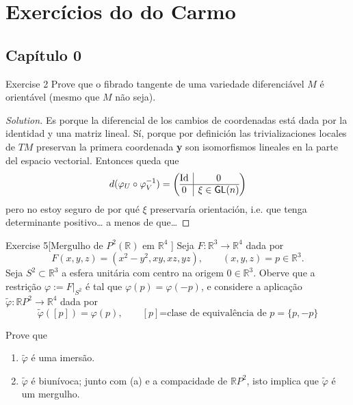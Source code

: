 \section{Exercícios do do Carmo}

\subsection{Capítulo 0}
\begin{thing4}{Exercise 2}\label{exer:2}\leavevmode
Prove que o fibrado tangente de uma variedade diferenciável \(M\) é orientável (mesmo que \(M\) não seja).
\end{thing4}

\begin{proof}[Solution]\leavevmode
Es porque la diferencial de los cambios de coordenadas está dada por la identidad y una matriz lineal. Sí, porque por definición las trivializaciones locales de \(TM\) preservan la primera coordenada \textbf{y} son isomorfismos lineales en la parte del espacio vectorial. Entonces queda que 
\[d(\varphi_U \circ \varphi_V^{-1})=\left(\begin{array}{@{}c|c@{}}
\operatorname{Id}&0\\
\hline
0&\xi \in \mathsf{GL}(n)\end{array}\right)\]
pero no estoy seguro de por qué \(\xi\) preservaría orientación, i.e. que tenga determinante positivo… a menos de que… 
\end{proof}

\begin{thing4}{Exercise 5}[Mergulho de \(P^2(\mathbb{R})\) em \(\mathbb{R}^4\) ]\label{exer:5}\leavevmode
Seja \(F:\mathbb{R}^3 \to \mathbb{R}^4\) dada por
\[F(x,y,z)=(x^2-y^2,xy,xz,yz),\qquad (x,y,z) = p \in \mathbb{R}^3.\]
Seja \(S^2 \subset \mathbb{R}^3\) a esfera unitária com centro na origem \(0 \in \mathbb{R}^3\). Oberve que a restrição \( \varphi:= F|_{S^2}\) é tal que \(\varphi(p)=\varphi(-p)\), e considere a aplicação \(\tilde{\varphi}:\mathbb{R}P^2 \to \mathbb{R}^4\) dada por
\[\tilde{ \varphi}([p])=\varphi(p),\qquad [p]\text{=clase de equivalência de \(p=\{p,-p\}\)} \]

Prove que
\begin{enumerate}[label=(\alph*)]
\item \(\tilde{\varphi}\) é uma imersão.
\item \(\tilde{\varphi}\) é biunívoca; junto com (a) e a compacidade de  \(\mathbb{R}P^2\), isto implica que \(\tilde{ \varphi}\) é um mergulho.
\end{enumerate}
\end{thing4}

